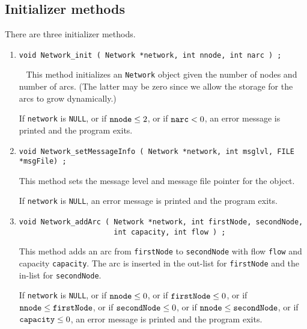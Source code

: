 \subsection{Initializer methods}
\label{subsection:Network:proto:initializers}
\par
There are three initializer methods.
\par
\begin{enumerate}
\item
\begin{verbatim}
void Network_init ( Network *network, int nnode, int narc ) ;
\end{verbatim}\
This method initializes an {\tt Network} object given the number of
nodes and number of arcs.
(The latter may be zero since we allow the storage for the arcs to
grow dynamically.)
\par {}
If {\tt network} is {\tt NULL},
or if ${\tt nnode} \le 2$,
or if ${\tt narc} < 0$,
an error message is printed and the program exits.
\item
\begin{verbatim}
void Network_setMessageInfo ( Network *network, int msglvl, FILE *msgFile) ;
\end{verbatim}
This method sets the message level and message file pointer for the
object.
\par {}
If {\tt network} is {\tt NULL},
an error message is printed and the program exits.
\item
\begin{verbatim}
void Network_addArc ( Network *network, int firstNode, secondNode,
                      int capacity, int flow ) ;
\end{verbatim}
This method adds an arc from {\tt firstNode} to {\tt secondNode}
with flow {\tt flow} and capacity {\tt capacity}.
The arc is inserted in the out-list for {\tt firstNode} and the
in-list for {\tt secondNode}.
\par {}
If {\tt network} is {\tt NULL},
or if ${\tt nnode} \le 0$,
or if ${\tt firstNode} \le 0$,
or if ${\tt nnode} \le {\tt firstNode}$,
or if ${\tt secondNode} \le 0$,
or if ${\tt nnode} \le {\tt secondNode}$,
or if ${\tt capacity} \le 0$,
an error message is printed and the program exits.
\end{enumerate}
\par
